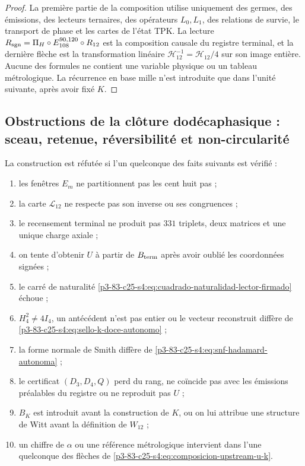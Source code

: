\begin{proof}
La première partie de la composition utilise uniquement des germes, des émissions,
des lecteurs ternaires, des opérateurs \(L_0,L_1\), des relations de survie,
le transport de phase et les cartes de l’état TPK. La lecture
\(R_{\rm sgn}=\Pi_H\circ E_{108}^{90,120}\circ R_{12}\) est la composition
causale du registre terminal, et la dernière flèche est la transformation linéaire
\(\mathcal H_{12}^{-1}=\mathcal H_{12}/4\)
sur son image entière. Aucune des formules ne contient une variable
physique ou un tableau métrologique. La récurrence en base mille n’est introduite que
dans l’unité suivante, après avoir fixé \(K\).
\end{proof}

\subsection{Obstructions de la clôture dodécaphasique : sceau, retenue, réversibilité et non-circularité}

\begin{remark}
La construction est réfutée si l’un quelconque des faits
suivants est vérifié :
\begin{enumerate}
 \item les fenêtres \(E_m\) ne partitionnent pas les cent huit pas ;
 \item la carte \(\mathcal L_{12}\) ne respecte pas son inverse ou ses congruences ;
 \item le recensement terminal ne produit pas \(331\) triplets, deux matrices et une unique
       charge axiale ;
 \item on tente d’obtenir \(U\) à partir de \(B_{\rm term}\) après avoir oublié les
       coordonnées signées ;
 \item le carré de naturalité
       \eqref{p3-83-c25-s4:eq:cuadrado-naturalidad-lector-firmado} échoue ;
 \item \(H_4^2\neq4I_4\), un antécédent n’est pas entier ou le vecteur
       reconstruit diffère de \eqref{p3-83-c25-s4:eq:sello-k-doce-autonomo} ;
 \item la forme normale de Smith diffère de
       \eqref{p3-83-c25-s4:eq:snf-hadamard-autonoma} ;
 \item le certificat \((D_3,D_4,Q)\) perd du rang, ne coïncide pas avec les
       émissions préalables du registre ou ne reproduit pas \(U\) ;
 \item \(B_K\) est introduit avant la construction de \(K\), ou on lui attribue une
       structure de Witt avant la définition de \(W_{12}\) ;
 \item un chiffre de \(\alpha\) ou une référence métrologique intervient dans
       l’une quelconque des flèches de \eqref{p3-83-c25-s4:eq:composicion-upstream-u-k}.
\end{enumerate}
\end{remark}


